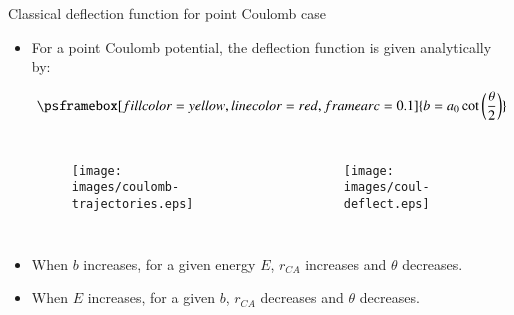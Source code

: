 \documentclass[english,10pt]{beamer}
\newcommand{\bi}{\begin{itemize}}
\newcommand{\images}{images}
\begin{document}
\begin{frame}{Classical deflection function for point Coulomb case}

\bi

\item For a point Coulomb potential, the deflection function is given analytically by:

$$
\psframebox[fillcolor=yellow,linecolor=red,framearc=0.1]{
b= a_0 \cot\left( \frac{\theta}{2} \right) %
}%
$$


\begin{columns}[t]
\begin{figure}{\par \resizebox*{0.8\textwidth}{!}
{\texttt{[image: \\images/coulomb-trajectories.eps]}} \par}
\end{figure}
%
\begin{figure}{\par \resizebox*{0.7\textwidth}{!}
{\texttt{[image: \\images/coul-deflect.eps]}} \par}
\end{figure}
\end{columns}%

\item[\ding{43}] When $b$ increases, for a given energy $E$,  $r_{CA}$ increases and $\theta$ decreases.

\item[\ding{43}] When $E$ increases, for a given $b$,  $r_{CA}$ decreases and $\theta$ decreases.
\end{itemize}
\end{frame}
\end{document}
